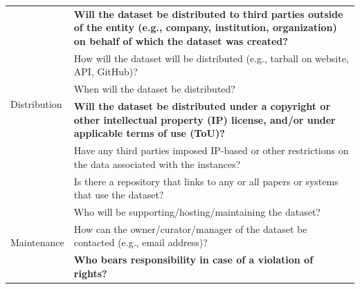 \documentclass[journal]{IEEEtran}
\begin{document}
\begin{table}[]
\begin{tabular}{|p{}|p{}|}
\multirow{6}{*}{Distribution}                    & \textbf{Will the dataset be distributed to third parties outside of the entity (e.g., company, institution, organization) on behalf of which the dataset was created?}                                                    \\
                                                 & How will the dataset will be distributed (e.g., tarball on website, API, GitHub)?                                                                                                                                         \\
                                                 & When will the dataset be distributed?                                                                                                                                                                                     \\
                                                 & \textbf{Will the dataset be distributed under a copyright or other intellectual property (IP) license, and/or under applicable terms of use (ToU)?}                                                                       \\
                                                 & Have any third parties imposed IP-based or other restrictions on the data associated with the instances?                                                                                                                  \\
                                                 & Is there a repository that links to any or all papers or systems that use the dataset?                                                                                                                                    \\ \hline
\multirow{8}{*}{Maintenance}                     & Who will be supporting/hosting/maintaining the dataset?                                                                                                                                                                   \\
  & How can the owner/curator/manager of the dataset be contacted (e.g., email address)?                                                                                                                                      \\
  & \textbf{Who bears responsibility in case of a violation of rights?}                                                                                                                                                       \\

\end{tabular}
\end{table}
\end{document}
